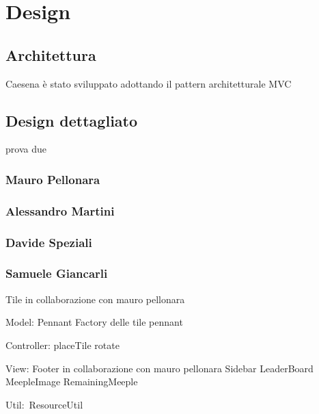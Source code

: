 \section{Design}
\subsection{Architettura}
Caesena è stato sviluppato adottando il pattern architetturale MVC 
\subsection{Design dettagliato}
prova due
\subsubsection*{Mauro Pellonara} 

\subsubsection*{Alessandro Martini}

\subsubsection*{Davide Speziali}

\subsubsection*{Samuele Giancarli}
Tile in collaborazione con mauro pellonara

Model:
Pennant
Factory delle tile pennant

Controller: placeTile
rotate

View:
Footer in collaborazione con mauro pellonara
Sidebar
LeaderBoard
MeepleImage
RemainingMeeple

Util: ResourceUtil